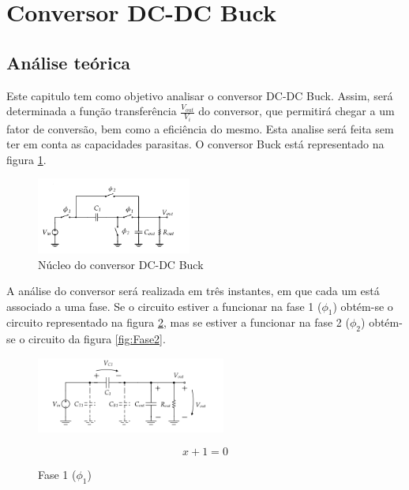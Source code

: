 \documentclass[12pt]{article}
\begin{document}
\section{Conversor DC-DC Buck}
\subsection{Análise teórica}
Este capitulo tem como objetivo analisar o conversor DC-DC Buck. Assim, será determinada a função transferência $\frac{V_{out}}{V_i}$ do conversor, que permitirá chegar a um fator de conversão, bem como a eficiência do mesmo. Esta analise será feita sem ter em conta as capacidades parasitas.
O conversor Buck está representado na figura  \ref{fig:Nucleo_do_conversor_DC-DC_Buck}.
\begin{figure}[htbp]
	\centering
	\includegraphics[height=2.5cm]{Buck}
	\caption{Núcleo do conversor DC-DC Buck}
	\label{fig:Nucleo_do_conversor_DC-DC_Buck}
\end{figure}

A análise do conversor será realizada em três instantes, em que cada um está associado a uma fase. Se o circuito estiver a funcionar na fase 1 ($\phi_1$) obtém-se o circuito representado na figura \ref{fig:Fase1}, mas se estiver a funcionar na fase 2 ($\phi_2$) obtém-se o circuito da figura \ref{fig:Fase2}.
	
\begin{figure}[htbp]
\centering
\begin{minipage}{.5\textwidth}
	\centering
	\includegraphics[width=1.1\linewidth, height=2.5cm]{Fase1}
	\caption{Fase 1 ($\phi_1$)}
	\label{fig:Fase1}
\end{minipage}%
\begin{minipage}{.5\textwidth}
	\centering
	\begin{equation}
		x+1=0
	\end{equation}					
\end{minipage}
\end{figure}
\end{document}
